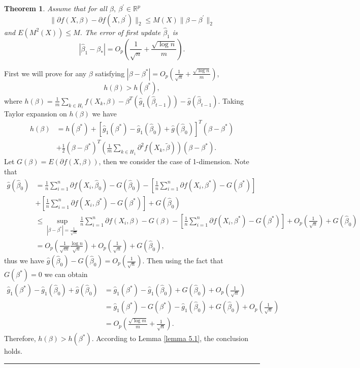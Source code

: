 \documentclass[12pt]{article}
\numberwithin{equation}{section}
\newtheorem{theorem}{Theorem}[section]
\newenvironment{proof}{{\bf Proof:}}{\hfill\rule{2mm}{2mm}}
\begin{document}
\DecMargin{1em}
\begin{theorem}\label{theorem 5.5}
	Assume that for all $\beta,\ \beta^{'}\in \mathbb{R}^p$
	$$\|\partial f(X,\beta)-\partial f(X,\beta^{'})\|_2\leq M(X)\|\beta-\beta^{'}\|_2$$ 
	and $E(M^2(X))\leq M$. The error of first update $\hat \beta_{1}$ is 
	\begin{equation}
	|\hat \beta_{1}-\beta_{*}|=O_p(\frac{1}{\sqrt{n}}+\frac{\sqrt{\log n}}{m}).
	\end{equation}
\end{theorem}
\begin{proof}
	First we will prove for any $\beta$ satisfying $|\beta-\beta^{*}|=O_p(\frac{1}{\sqrt{n}}+\frac{\sqrt{\log n}}{m})$, 
	$$
	h(\beta)>h(\beta^{*}),
	$$
	where $h(\beta) = \frac{1}{m}\sum_{k \in H_i}f(X_k,\beta)-\beta^T(\hat g_1(\hat \beta_{t-1}))-\hat g(\hat \beta_{t-1})$. Taking Taylor expansion on $h(\beta)$ we have
	\begin{align*}
	h(\beta)&=h(\beta^{*})+\left[\hat g_1(\beta^{*})-\hat g_1(\hat \beta_0)+\hat g(\hat \beta_0)\right]^T(\beta-\beta^{*})\\
	&+\frac{1}{2}(\beta-\beta^{*})^T\left(\frac{1}{m}\sum_{k \in H_1}\partial^2 f(X_k,\tilde \beta)\right) (\beta-\beta^{*}).
	\end{align*}
	Let $G(\beta)=E(\partial f(X,\beta))$, then we consider the case of 1-dimension. Note that
	\begin{align*}
	\hat g(\hat \beta_0)&=\frac{1}{n}\sum_{i=1}^n\partial f(X_i,\hat \beta_0)-G(\hat\beta_0)-\left[\frac{1}{n}\sum_{i=1}^n\partial f(X_i,\beta^*)-G(\beta^*)\right]\\
	&+\left[\frac{1}{n}\sum_{i=1}^n\partial f(X_i,\beta^*)-G(\beta^*)\right]+G(\hat \beta_0)\\
	&\leq \sup_{|\beta-\beta^{*}|=\frac{1}{\sqrt{m}}}\frac{1}{n}\sum_{i=1}^n\partial f(X_i,\beta)-G(\beta)-\left[\frac{1}{n}\sum_{i=1}^n\partial f(X_i,\beta^*)-G(\beta^*)\right]+O_p(\frac{1}{\sqrt{n}})+G(\hat \beta_0)\\
	&=O_p(\frac{1}{\sqrt{m}}\frac{\log n}{\sqrt{n}})+O_p(\frac{1}{\sqrt{n}})+G(\hat \beta_0),
	\end{align*}
	thus we have $\hat g(\hat \beta_0)-G(\hat \beta_0)=O_p(\frac{1}{\sqrt{n}})$. Then using the fact that $G(\beta^{*})=0$ we can obtain
	\begin{align*}
	\hat g_1(\beta^{*})-\hat g_1(\hat \beta_0)+\hat g(\hat \beta_0)&= \hat g_1(\beta^{*})-\hat g_1(\hat \beta_0)+G(\hat\beta_0)+O_p(\frac{1}{\sqrt{n}})\\
	&=\hat g_1(\beta^{*})-G(\beta^{*})-\hat g_1(\hat \beta_0)+G(\hat\beta_0)+O_p(\frac{1}{\sqrt{n}})\\
	&=O_p(\frac{\sqrt{\log m}}{m}+\frac{1}{\sqrt{n}}).
	\end{align*}
	Therefore, $h(\beta)>h(\beta^{*})$. According to Lemma \ref{lemma 5.1}, the conclusion holds.
\end{proof}
\end{document}
